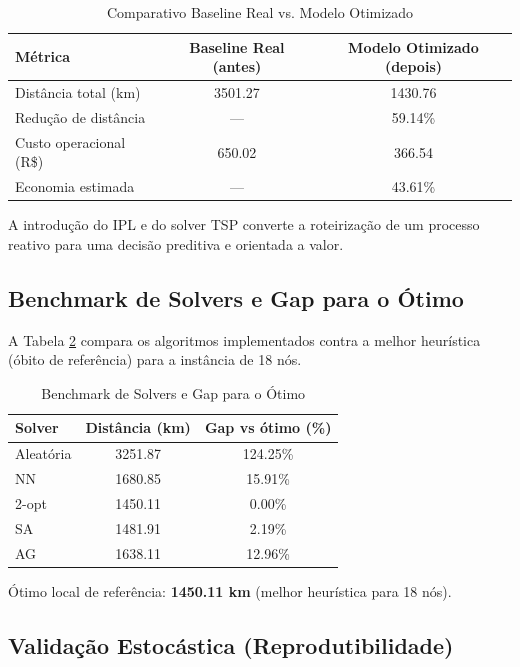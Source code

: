 \documentclass[11pt,a4paper,twocolumn]{article}
\begin{document}
\begin{table}[H]
\centering
\caption{Comparativo Baseline Real vs. Modelo Otimizado}
\label{tab:baseline_comparativo}
\begin{tabular}{|l|c|c|}
\hline
\textbf{Métrica} & \textbf{Baseline Real (antes)} & \textbf{Modelo Otimizado (depois)} \\
\hline
Distância total (km) & 3501.27 & 1430.76 \\
Redução de distância & --- & 59.14\% \\
Custo operacional (R\$) & 650.02 & 366.54 \\
Economia estimada & --- & 43.61\% \\
\hline
\end{tabular}
\end{table}

A introdução do IPL e do solver TSP converte a roteirização de um processo reativo para uma decisão preditiva e orientada a valor.

\subsection{Benchmark de Solvers e Gap para o Ótimo}

A Tabela \ref{tab:benchmark_solvers} compara os algoritmos implementados contra a melhor heurística (óbito de referência) para a instância de 18 nós.

\begin{table}[H]
\centering
\caption{Benchmark de Solvers e Gap para o Ótimo}
\label{tab:benchmark_solvers}
\begin{tabular}{|l|c|c|}
\hline
\textbf{Solver} & \textbf{Distância (km)} & \textbf{Gap vs ótimo (\%)} \\
\hline
Aleatória & 3251.87 & 124.25\% \\
NN & 1680.85 & 15.91\% \\
2-opt & 1450.11 & 0.00\% \\
SA & 1481.91 & 2.19\% \\
AG & 1638.11 & 12.96\% \\
\hline
\end{tabular}
\end{table}

Ótimo local de referência: \textbf{1450.11 km} (melhor heurística para 18 nós).

\subsection{Validação Estocástica (Reprodutibilidade)}
\end{document}
